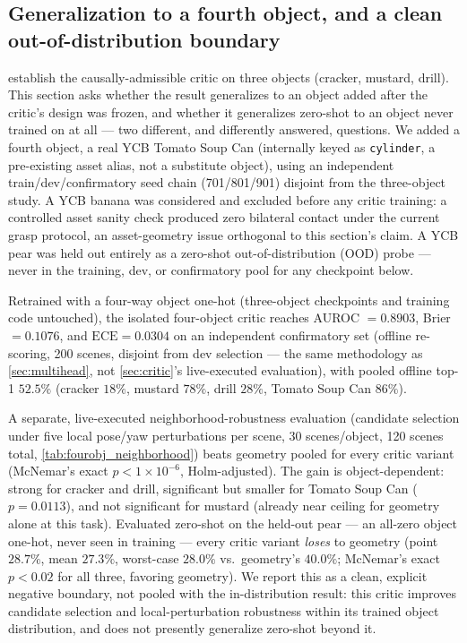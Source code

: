 \documentclass[journal]{IEEEtran}
\begin{document}
\subsection{Generalization to a fourth object, and a clean out-of-distribution boundary}
\label{sec:fourobj}

 establish the causally-admissible critic on
three objects (cracker, mustard, drill). This section asks whether the
result generalizes to an object added after the critic's design was frozen,
and whether it generalizes zero-shot to an object never trained on at all
--- two different, and differently answered, questions. We added a fourth
object, a real YCB Tomato Soup Can (internally keyed as
\texttt{cylinder}, a pre-existing asset alias, not a substitute object),
using an independent train/dev/confirmatory seed chain (701/801/901)
disjoint from the three-object study. A YCB banana was considered and
excluded before any critic training: a controlled asset sanity check
produced zero bilateral contact under the current grasp protocol, an
asset-geometry issue orthogonal to this section's claim. A YCB pear was
held out entirely as a zero-shot out-of-distribution (OOD) probe --- never
in the training, dev, or confirmatory pool for any checkpoint below.

Retrained with a four-way object one-hot (three-object checkpoints and
training code untouched), the isolated four-object critic reaches AUROC
$=0.8903$, Brier $=0.1076$, and $\mathrm{ECE}=0.0304$ on an independent
confirmatory set (offline re-scoring, 200 scenes, disjoint from dev
selection --- the same methodology as \cref{sec:multihead}, not
\cref{sec:critic}'s live-executed evaluation), with pooled offline top-1
$52.5\%$ (cracker $18\%$, mustard $78\%$, drill $28\%$, Tomato Soup Can
$86\%$).

A separate, live-executed neighborhood-robustness evaluation (candidate
selection under five local pose/yaw perturbations per scene, 30
scenes/object, 120 scenes total, \cref{tab:fourobj_neighborhood}) beats
geometry pooled for every critic variant (McNemar's exact
$p{<}1{\times}10^{-6}$, Holm-adjusted). The gain is object-dependent:
strong for cracker and drill, significant but smaller for Tomato Soup Can
($p=0.0113$), and not significant for mustard (already near ceiling for
geometry alone at this task). Evaluated zero-shot on the held-out pear ---
an all-zero object one-hot, never seen in training --- every critic
variant \emph{loses} to geometry (point $28.7\%$, mean $27.3\%$,
worst-case $28.0\%$ vs.\ geometry's $40.0\%$; McNemar's exact
$p<0.02$ for all three, favoring geometry). We report this as a clean,
explicit negative boundary, not pooled with the in-distribution result:
this critic improves candidate selection and local-perturbation robustness
within its trained object distribution, and does not presently generalize
zero-shot beyond it.
\end{document}
